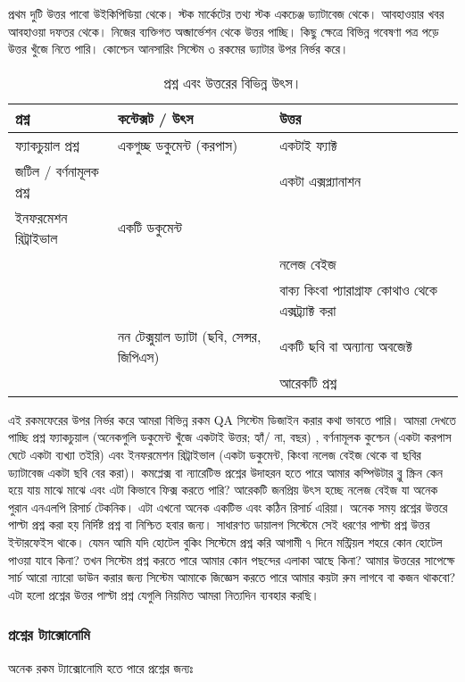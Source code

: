 প্রথম দুটি উত্তর পাবো উইকিপিডিয়া থেকে। স্টক মার্কেটের তথ্য স্টক একচেঞ্জ ড্যাটাবেজ থেকে। আবহাওয়ার খবর আবহাওয়া দফতর থেকে। নিজের ব্যক্তিগত অব্জার্ভেশন থেকে উত্তর পাচ্ছি। কিছু ক্ষেত্রে বিভিন্ন গবেষণা পত্র পড়ে উত্তর খুঁজে নিতে পারি। কোশ্চেন আনসারিং সিস্টেম ৩ রকমের ড্যাটার উপর নির্ভর করে। 



\begin{table}[!ht]
\begin{tabular}{  p{10em}  p{5cm} p{7cm}} 
  \toprule
  প্রশ্ন & কন্টেক্সট / উৎস & উত্তর \\
  \bottomrule
  ফ্যাকচুয়াল প্রশ্ন  & একগুচ্ছ ডকুমেন্ট (করপাস) & একটাই ফ্যাক্ট  \\ 
  জটিল / বর্ণনামূলক প্রশ্ন  & & একটা এক্সপ্ল্যানাশন \\ 
  ইনফরমেশন রিট্রাইভাল  &  একটি ডকুমেন্ট &  \\ 
  & & নলেজ বেইজ   \\ 
  & & বাক্য কিংবা প্যারাগ্রাফ কোথাও থেকে এক্সট্র্যাক্ট করা \\  
  & নন টেক্সুয়াল ড্যাটা (ছবি, সেন্সর, জিপিএস)  & একটি ছবি বা অন্যান্য অবজেক্ট \\
   & & আরেকটি প্রশ্ন \\ 
  \bottomrule
\end{tabular}
\caption{প্রশ্ন এবং উত্তরের বিভিন্ন উৎস।}
\end{table}

এই রকমফেরের উপর নির্ভর করে আমরা বিভিন্ন রকম QA সিস্টেম ডিজাইন করার কথা ভাবতে পারি। আমরা দেখতে পাচ্ছি প্রশ্ন ফ্যাকচুয়াল (অনেকগুলি ডকুমেন্ট খুঁজে একটাই উত্তর; হ্যাঁ/ না, বছর) , বর্ণনামূলক  কুশ্চেন (একটা করপাস ঘেটে একটা ব্যখ্যা তইরি) এবং ইনফরমেশন রিট্রাইভাল (একটা ডকুমেন্ট,  কিংবা নলেজ বেইজ থেকে বা ছবির ড্যাটাবেজ একটা ছবি বের করা)। কমপ্লেক্স বা ন্যারেটিভ  প্রশ্নের উদাহরন হতে পারে আমার কম্পিউটার ব্লু স্ক্রিন কেন হয়ে যায় মাঝে মাঝে এবং এটা কিভাবে ফিক্স করতে পারি? আরেকটি জনপ্রিয় উৎস হচ্ছে নলেজ বেইজ যা অনেক পুরান এনএলপি রিসার্চ টেকনিক। এটা এখনো অনেক একটিভ এবং কঠিন রিসার্চ এরিয়া। অনেক সময় প্রশ্নের উত্তরে পাল্টা প্রশ্ন করা হয় নির্দিষ্ট প্রশ্ন বা নিশ্চিত হবার জন্য। সাধারণত ডায়ালগ সিস্টেমে সেই ধরণের পাল্টা প্রশ্ন উত্তর ইন্টারফেইস থাকে। যেমন আমি যদি হোটেল বুকিং সিস্টেমে প্রশ্ন করি আগামী ৭ দিনে মন্ট্রিয়ল শহরে কোন হোটেল পাওয়া যাবে কিনা? তখন সিস্টেম প্রশ্ন করতে পারে আমার কোন পছন্দের এলাকা আছে কিনা? আমার উত্তরের সাপেক্ষে সার্চ আরো ন্যারো ডাউন করার জন্য সিস্টেম আমাকে জিজ্ঞেস করতে পারে আমার কয়টা রুম লাগবে বা কজন থাকবো? এটা হলো প্রশ্নের উত্তর পাল্টা প্রশ্ন যেগুলি নিয়মিত আমরা নিত্যদিন ব্যবহার করছি।

\subsubsection{প্রশ্নের ট্যাক্সোনোমি}
অনেক রকম ট্যাক্সোনোমি হতে পারে প্রশ্নের জন্যঃ 

